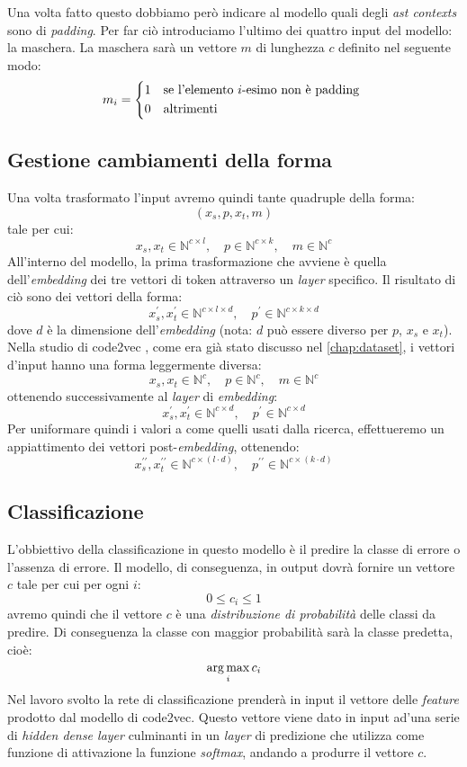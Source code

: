 Una volta fatto questo dobbiamo però indicare al modello quali degli \textit{ast contexts} sono di \textit{padding}. 
Per far ciò introduciamo l'ultimo dei quattro input del modello: la maschera.
La maschera sarà un vettore $m$ di lunghezza $c$ definito nel seguente modo:
    \begin{align*}
        m_i =
        \begin{cases*}
        1 & se l'elemento $i$-esimo non è padding \\
        0 & altrimenti
        \end{cases*}
    \end{align*}

\subsection{Gestione cambiamenti della forma}
Una volta trasformato l'input avremo quindi tante quadruple della forma:
    \[(x_s, p, x_t, m)\]
tale per cui:
\[x_s, x_t \in \mathbb{N}^{c \times l}, \quad p \in \mathbb{N}^{c \times k}, \quad m \in  \mathbb{N}^{c}\]
All'interno del modello, la prima trasformazione che avviene è quella dell'\textit{embedding} dei tre vettori di token attraverso un \textit{layer} specifico.
Il risultato di ciò sono dei vettori della forma:
    \[x_s^{\prime}, x_t^{\prime} \in \mathbb{N}^{c \times l \times d}, \quad p^{\prime} \in \mathbb{N}^{c \times k \times d}\]
dove $d$ è la dimensione dell'\textit{embedding} (nota: $d$ può essere diverso per $p$, $x_s$ e $x_t$).
Nella studio di code2vec \cite{alon2019code2vec}, come era già stato discusso nel \autoref{chap:dataset}, i vettori d'input hanno una forma leggermente diversa:
\[x_s, x_t \in \mathbb{N}^{c}, \quad p \in \mathbb{N}^{c}, \quad m \in  \mathbb{N}^{c}\]
ottenendo successivamente al \textit{layer} di \textit{embedding}:
\[x_s^{\prime}, x_t^{\prime} \in \mathbb{N}^{c \times d}, \quad p^{\prime} \in \mathbb{N}^{c \times d}\]
Per uniformare quindi i valori a come quelli usati dalla ricerca, effettueremo un appiattimento dei vettori post-\textit{embedding}, ottenendo:
\[x_s^{\prime\prime}, x_t^{\prime\prime} \in \mathbb{N}^{c \times (l \cdot d)}, \quad p^{\prime\prime} \in \mathbb{N}^{c \times (k \cdot d)}\]


\subsection{Classificazione}
L'obbiettivo della classificazione in questo modello è il predire la classe di errore o l'assenza di errore. 
Il modello, di conseguenza, in output dovrà fornire un vettore $c$ tale per cui per ogni $i$:
\[0 \leq c_i \leq 1\]
avremo quindi che il vettore $c$ è una \textit{distribuzione di probabilità} delle classi da predire.
Di conseguenza la classe con maggior probabilità sarà la classe predetta, cioè:
    \[\operatorname*{arg\,max}_i c_i\]
Nel lavoro svolto la rete di classificazione prenderà in input il vettore delle \textit{feature} prodotto dal modello di code2vec.
Questo vettore viene dato in input ad'una serie di \textit{hidden dense layer} culminanti in un \textit{layer} di predizione che utilizza come funzione di attivazione la funzione \textit{softmax}, andando a produrre il vettore $c$.

